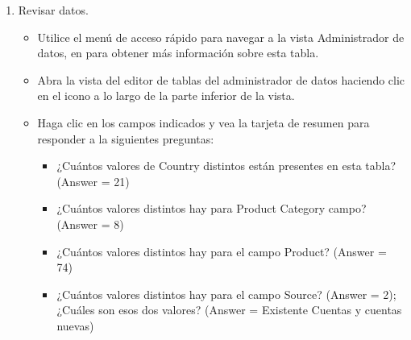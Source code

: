 \documentclass[12pt,letterpaper]{article}
\begin{document}
\begin{enumerate}
    \item Revisar datos.
    \begin{itemize}
        \item Utilice el menú de acceso rápido para navegar a la vista Administrador de datos, en para obtener más información sobre esta tabla.
        \item Abra la vista del editor de tablas del administrador de datos haciendo clic en el icono a lo largo de la parte inferior de la vista.
        \item Haga clic en los campos indicados y vea la tarjeta de resumen para responder a la siguientes preguntas:
        \begin{itemize}
            \item ¿Cuántos valores de Country distintos están presentes en esta tabla? (Answer = 21)
            \item ¿Cuántos valores distintos hay para Product Category campo? (Answer = 8)
            \item ¿Cuántos valores distintos hay para el campo Product? (Answer = 74)
            \item ¿Cuántos valores distintos hay para el campo Source? (Answer = 2); ¿Cuáles son esos dos valores? (Answer = Existente Cuentas y cuentas nuevas)
        \end{itemize}
    \end{itemize}


\end{enumerate}
\end{document}
